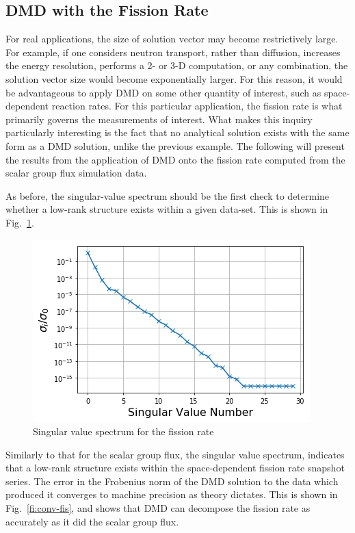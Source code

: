 \documentclass[12pt]{article}
\newcommand{\LFI}[1]{\label{fi:#1}}
\newcommand{\FI}[1]{Fig.~\ref{fi:#1}}
\newcommand{\bfg}{\begin{figure}}
\newcommand{\efg}{\end{figure}}
\begin{document}
\subsection{DMD with the Fission Rate}
For real applications, the size of solution vector may become restrictively 
large. 
For example, if one considers neutron transport, rather than diffusion, 
	increases the energy resolution,  performs a 2- or 3-D computation, or any 
	combination, the solution vector size would become exponentially larger. 
For this reason, it would be  advantageous to apply DMD on some other quantity 
	of interest, such as space-dependent reaction rates.
For this particular application, the fission rate is what primarily governs the 
	measurements of interest.
What makes this inquiry particularly interesting is the fact that no analytical
	solution exists with the same form as a DMD solution, unlike the previous
	example.
The following will present the results from the application of DMD onto the 
	fission rate computed from the scalar group flux simulation data.

As before, the singular-value spectrum should be the first check to determine 
	whether a low-rank structure exists within a given data-set. 
This is shown in \FI{sv-fis}.
%
\bfg[!htb] \centering
	\includegraphics[scale=0.5]{singularValueSpectrum_fis.png}
	\caption{Singular value spectrum for the fission rate}
	\LFI{sv-fis}
\efg
Similarly to that for the scalar group flux, the singular value spectrum, 
	indicates that a low-rank structure exists within the space-dependent fission 
	rate snapshot series.
The error in the Frobenius norm of the DMD solution to the data which produced 
	it converges to machine precision as theory dictates.
This is shown in \FI{conv-fis}, and shows that DMD can decompose the fission
	rate as accurately as it did the scalar group flux.
\end{document}
